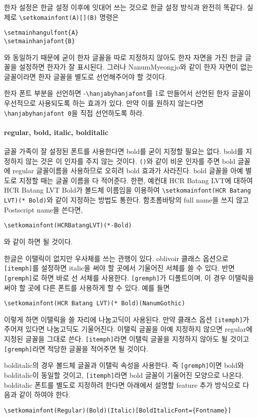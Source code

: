 \documentclass[
	12pt,
	a4paper,
	kosection,
	footnote,
	nobookmarks,
	microtype,
]{oblivoir}
\begin{document}
한자 설정은 한글 설정 이후에 잇대어 쓰는 것으로 한글 설정 방식과 완전히 똑같다.
실제로 \verb|\setkomainfont(A)[](B)| 명령은
\begin{verbatim}
\setmainhangulfont{A}
\setmainhanjafont{B}
\end{verbatim}
와 동일하기 때문에 굳이 한자 글꼴을 따로 지정하지 않아도 한자 자면을 가진 한글 글꼴을 설정하면
한자가 잘 표시된다.
그러나 NanumMyeongjo와 같이 한자 자면이 없는 글꼴이라면 한자 글꼴을 별도로 선언해주어야 할 
것이다.

한자 폰트 부분을 선언하면 \LuaTeX- \verb|\hanjabyhanjafont|를 1로 만들어서 선언된
한자 글꼴이 우선적으로 사용되도록 하는 효과가 있다. 만약 이를 원하지 않는다면 \verb|\hanjabyhanjafont 0|을
직접 선언하도록 하라.

\paragraph{regular, bold, italic, bolditalic}
글꼴 가족이 잘 설정된 폰트를 사용한다면 bold를 굳이 지정할 필요는 없다.
bold를 지정하지 않는 것은 이 인자를 주지 않는 것이다. \verb|()|와 같이 비운 인자를 주면
bold 글꼴에 regular 글꼴이름을 사용하므로 오히려 bold 효과가 사라진다.
bold 글꼴을 아예 별도로 지정할 때는 글꼴 이름을 다 적어준다. 한편, 예컨대
HCR Batang LVT에 대하여 HCR Batang LVT Bold가 볼드체 이름임을 이용하여
\verb|\setkomainfont(HCR Batang LVT)(* Bold)|와 같이 지정하는 방법도 통한다.
함초롬바탕의 full name을 쓰지 않고 Postscript name을 쓴다면,
\begin{verbatim}
\setkomainfont(HCRBatangLVT)(*-Bold)
\end{verbatim}
와 같이 하면 될 것이다.

한글은 이탤릭이 없지만 우사체를 쓰는 관행이 있다. oblivoir 클래스 옵션으로 \texttt{[itemph]}를
설정하면 italic을 써야 할 곳에서 기울어진 서체를 쓸 수 있다. 반면 \texttt{[gremph]}로 하면
바로 선 서체를 사용한다. \texttt{[gremph]}가 디폴트이며, 이 경우 이탤릭을 써야 할 곳에 다른
폰트를 사용하게 할 수 있다. 예를 들면
\begin{verbatim}
\setkomainfont(HCR Batang LVT)(* Bold)(NanumGothic)
\end{verbatim}
이렇게 하면 이탤릭을 쓸 자리에 나눔고딕이 사용된다. 만약 클래스 옵션 \texttt{[itemph]}가
주어져 있다면 나눔고딕도 기울어진다.
이탤릭 글꼴을 아예 지정하지 않으면 regular에 지정된 글꼴을 그대로 쓴다. \texttt{[itemph]}라면
이탤릭 글꼴을 지정하지 않아도 될 것이고 \texttt{[gremph]}라면 적당한 글꼴을 적어주면 될 것이다.

bolditalic의 경우 볼드체 글꼴과 이탤릭 속성을 사용한다. 즉 \texttt{[gremph]}이면 bold와
bolditalic이 동일할 것이고, \texttt{[itemph]}라면 bold 글꼴이 기울어진 모양으로 나온다.
bolditalic 폰트를 별도로 지정하려 한다면 아래에서 설명할 feature 추가 방식으로 다음과 같이 하여야 한다.
\begin{verbatim}
\setkomainfont(Regular)(Bold)(Italic)[BoldItalicFont={Fontname}]
\end{verbatim}
\end{document}
